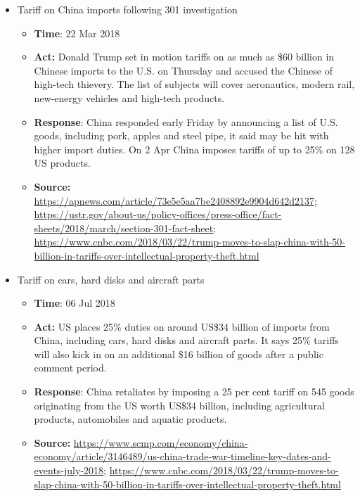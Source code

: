 \begin{itemize}
			\item	Tariff on China imports following 301 investigation
				\begin{itemize}
				\item \textbf{Time}: 22 Mar 2018
				\item \textbf{Act:} Donald Trump set in motion tariffs on as much as \$60 billion in Chinese imports to the U.S. on Thursday and accused the Chinese of high-tech thievery. The list of subjects will cover aeronautics, modern rail, new-energy vehicles and high-tech products.
				\item \textbf{Response}: China responded early Friday by announcing a list of U.S. goods, including pork, apples and steel pipe, it said may be hit with higher import duties. On 2 Apr China imposes tariffs of up to 25\% on 128 US products.
				\item	\textbf{Source:} \url{https://apnews.com/article/73e5e5aa7be2408892e9904d642d2137}; \url{https://ustr.gov/about-us/policy-offices/press-office/fact-sheets/2018/march/section-301-fact-sheet}; \url{https://www.cnbc.com/2018/03/22/trump-moves-to-slap-china-with-50-billion-in-tariffs-over-intellectual-property-theft.html}
				\end{itemize}

			\item	Tariff on cars, hard disks and aircraft parts
				\begin{itemize}
				\item \textbf{Time}: 06 Jul 2018
				\item \textbf{Act:} US places 25\% duties on around US\$34 billion of imports from China, including cars, hard disks and aircraft parts. It says 25\% tariffs will also kick in on an additional \$16 billion of goods after a public comment period. 
				\item \textbf{Response}: China retaliates by imposing a 25 per cent tariff on 545 goods originating from the US worth US\$34 billion, including agricultural products, automobiles and aquatic products.
				\item	\textbf{Source:} \url{https://www.scmp.com/economy/china-economy/article/3146489/us-china-trade-war-timeline-key-dates-and-events-july-2018}; \url{https://www.cnbc.com/2018/03/22/trump-moves-to-slap-china-with-50-billion-in-tariffs-over-intellectual-property-theft.html}
				\end{itemize}
				

\end{itemize}
